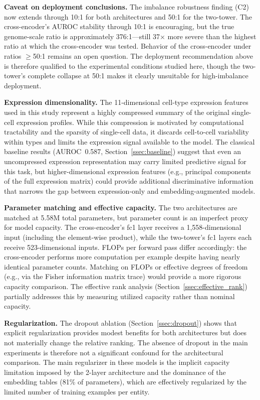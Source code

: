 \documentclass[journal]{IEEEtran}
\begin{document}
\textbf{Caveat on deployment conclusions.}
The imbalance robustness finding (C2) now extends through 10:1 for both
architectures and 50:1 for the two-tower. The cross-encoder's AUROC stability
through 10:1 is encouraging, but the true genome-scale ratio is approximately
376:1---still 37$\times$ more severe than the highest ratio at which the
cross-encoder was tested. Behavior of the cross-encoder under ratios
$\geq$50:1 remains an open question. The deployment recommendation above is
therefore qualified to the experimental conditions studied here, though the
two-tower's complete collapse at 50:1 makes it clearly unsuitable for
high-imbalance deployment.

\textbf{Expression dimensionality.}
The 11-dimensional cell-type expression features used in this study represent
a highly compressed summary of the original single-cell expression profiles.
While this compression is motivated by computational tractability and the
sparsity of single-cell data, it discards cell-to-cell variability within
types and limits the expression signal available to the model. The classical
baseline results (AUROC~0.587, Section~\ref{ssec:baseline}) suggest that
even an uncompressed expression representation may carry limited predictive
signal for this task, but higher-dimensional expression features (e.g.,
principal components of the full expression matrix) could provide additional
discriminative information that narrows the gap between expression-only and
embedding-augmented models.

\textbf{Parameter matching and effective capacity.}
The two architectures are matched at 5.58M total parameters, but parameter
count is an imperfect proxy for model capacity. The cross-encoder's fc1 layer
receives a 1,558-dimensional input (including the element-wise product),
while the two-tower's fc1 layers each receive 523-dimensional inputs.
FLOPs per forward pass differ accordingly: the cross-encoder performs more
computation per example despite having nearly identical parameter counts.
Matching on FLOPs or effective degrees of freedom (e.g., via the Fisher
information matrix trace) would provide a more rigorous capacity comparison.
The effective rank analysis (Section~\ref{ssec:effective_rank}) partially
addresses this by measuring utilized capacity rather than nominal capacity.

\textbf{Regularization.}
The dropout ablation (Section~\ref{ssec:dropout}) shows that explicit
regularization provides modest benefits for both architectures but does not
materially change the relative ranking. The absence of dropout in the main
experiments is therefore not a significant confound for the architectural
comparison. The main regularizer in these models is the implicit capacity
limitation imposed by the 2-layer architecture and the dominance of the
embedding tables (81\% of parameters), which are effectively regularized
by the limited number of training examples per entity.
\end{document}

